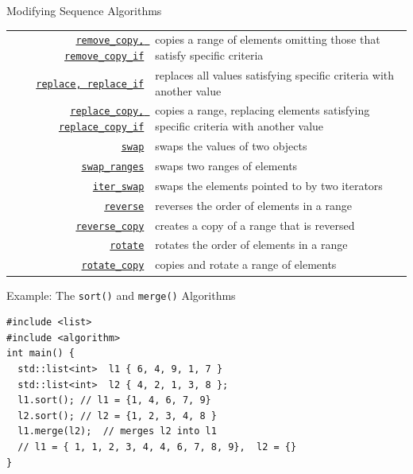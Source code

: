 \documentclass[14pt,aspectratio=1610]{beamer}
\begin{document}
\begin{frame}{Modifying Sequence Algorithms}
\footnotesize\renewcommand{\ULdepth}{3pt}\renewcommand{\arraystretch}{1.3}
\begin{tabularx}{\textwidth}{r X}
\href{https://en.cppreference.com/w/cpp/algorithm/remove_copy}{\lstinline{remove_copy, remove_copy_if}} &
  copies a range of elements omitting those that satisfy specific criteria\\
\href{https://en.cppreference.com/w/cpp/algorithm/replace}{\lstinline{replace, replace_if}} &
  replaces all values satisfying specific criteria with another value\\
\href{https://en.cppreference.com/w/cpp/algorithm/replace_copy}{\lstinline{replace_copy, replace_copy_if}} &
  copies a range, replacing elements satisfying specific criteria with another value\\
\href{https://en.cppreference.com/w/cpp/algorithm/swap}{\lstinline{swap}} &
  swaps the values of two objects\\
\href{https://en.cppreference.com/w/cpp/algorithm/swap_ranges}{\lstinline{swap_ranges}} &
  swaps two ranges of elements\\
\href{https://en.cppreference.com/w/cpp/algorithm/iter_swap}{\lstinline{iter_swap}} &
  swaps the elements pointed to by two iterators\\
\href{https://en.cppreference.com/w/cpp/algorithm/reverse}{\lstinline{reverse}} &
  reverses the order of elements in a range\\
\href{https://en.cppreference.com/w/cpp/algorithm/reverse_copy}{\lstinline{reverse_copy}} &
  creates a copy of a range that is reversed\\
\href{https://en.cppreference.com/w/cpp/algorithm/rotate}{\lstinline{rotate}} &
  rotates the order of elements in a range\\
\href{https://en.cppreference.com/w/cpp/algorithm/rotate_copy}{\lstinline{rotate_copy}} &
  copies and rotate a range of elements\\
\end{tabularx}
\end{frame}

\begin{frame}[fragile]{Example: The \texttt{sort()} and \texttt{merge()} Algorithms}

\begin{lstlisting}[basicstyle=\small\ttfamily]
#include <list>
#include <algorithm>
int main() {
  std::list<int>  l1 { 6, 4, 9, 1, 7 }
  std::list<int>  l2 { 4, 2, 1, 3, 8 };
  l1.sort(); // l1 = {1, 4, 6, 7, 9}
  l2.sort(); // l2 = {1, 2, 3, 4, 8 }
  l1.merge(l2);  // merges l2 into l1
  // l1 = { 1, 1, 2, 3, 4, 4, 6, 7, 8, 9},  l2 = {}
}
\end{lstlisting}
\end{frame}
\end{document}
